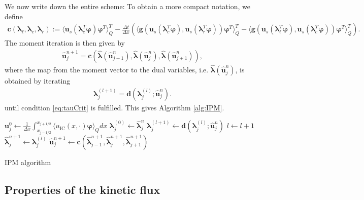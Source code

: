 We now write down the entire scheme: To obtain a more compact notation, we define
\begin{align}\label{eq:momentIterationFunction}
\bm{c}\left(\bm{\lambda}_{\ell},\bm{\lambda}_c,\bm{\lambda}_r\right):= \langle \bm u_{s}(\bm{\lambda}_c^T\bm{\varphi})\bm{\varphi}^T\rangle_Q^T - \frac{\Delta t}{\Delta x}\left(\langle \bm g(\bm u_{s}(\bm{\lambda}_c^T\bm{\varphi}),\bm u_{s}(\bm{\lambda}_r^T\bm{\varphi}))\bm{\varphi}^T\rangle_Q^T-\langle \bm g(\bm u_{s}(\bm{\lambda}_{\ell}^T\bm{\varphi}),\bm u_{s}(\bm{\lambda}_c^T\bm{\varphi}))\bm{\varphi}^T\rangle_Q^T\right).
\end{align}
The moment iteration is then given by
\begin{align}\label{eq:momentIteration}
\bm{\hat u}_j^{n+1} = \bm{c}\left(\bm{\hat\lambda}(\bm{\hat u}_{j-1}^n),\bm{\hat\lambda}(\bm{\hat u}_{j}^n),\bm{\hat\lambda}(\bm{\hat u}_{j+1}^n)\right),
\end{align}
where the map from the moment vector to the dual variables, i.e. $\bm{\hat\lambda}(\bm{\hat u}_{j}^n)$, is obtained by iterating
\begin{align}\label{eq:dualIteration}
\bm{\lambda}_j^{(l+1)} = \bm{d}(\bm{\lambda}_{j}^{(l)};\bm{\hat u}_j^{n}).
\end{align}
until condition \eqref{eq:tauCrit} is fulfilled. This gives Algorithm \ref{alg:IPM}.

\begin{algorithm}[H]
\begin{algorithmic}[1]
\State $\bm{u}_j^0 \leftarrow \frac{1}{\Delta x} \int_{x_{j-1/ 2}}^{x_{j+1/ 2}} \langle u_{\text{IC}}(x, \cdot) \bm{\varphi} \rangle_Q dx$
\EndFor
{}
\State $\bm{\lambda}_j^{(0)} \leftarrow \bm{\hat \lambda}_j^{n}$
\State $\bm{\lambda}_j^{(l+1)} \leftarrow \bm{d}(\bm{\lambda}_{j}^{(l)};\bm{\hat u}_j^{n})$
\State $l \leftarrow l+1$
\EndWhile
\State $\bm{\hat \lambda}_j^{n+1} \leftarrow \bm{\lambda}_j^{(l)}$
\EndFor
{}
\State $\bm{\hat u}_j^{n+1} \leftarrow \bm{c}(\bm{\hat \lambda}_{j-1}^{n+1},\bm{\hat \lambda}_j^{n+1},\bm{\hat \lambda}_{j+1}^{n+1})$
\EndFor
\EndFor
\end{algorithmic}
\caption{IPM algorithm}
\label{alg:IPM}
\end{algorithm}

\subsection{Properties of the kinetic flux}
\label{sec:costNumFlux}

